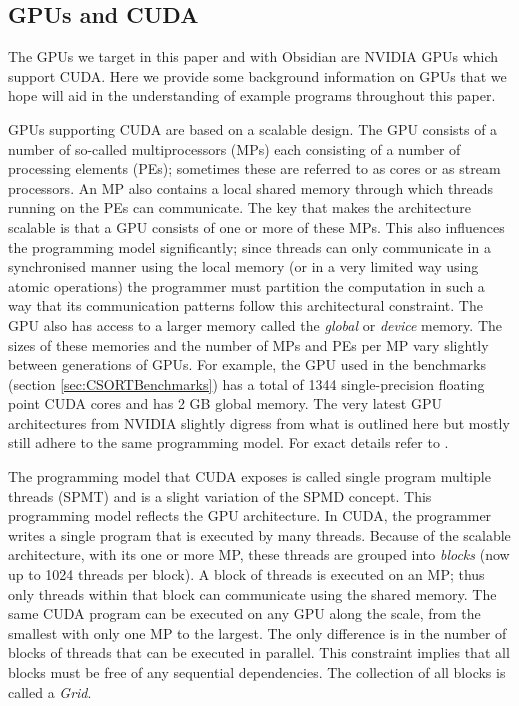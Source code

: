 \subsection{GPUs and CUDA} 

The GPUs we target in this paper and with Obsidian are NVIDIA GPUs which
support CUDA. Here we provide some background information on GPUs 
that we hope will aid in the understanding of example programs throughout this paper. 


GPUs supporting CUDA are based on a scalable design. The GPU consists of a 
number of so-called multiprocessors (MPs) each consisting of a number of 
processing elements (PEs); sometimes these are referred to as cores or as 
stream processors. An MP also contains a local shared memory through which 
threads running on the PEs can communicate. The key that 
makes the architecture scalable is that a GPU consists of one or more 
of these MPs. This also influences the programming model significantly; since
threads can only communicate in a synchronised manner using the local memory 
(or in a very limited way using atomic operations) the programmer must 
partition the computation in such a way that its communication patterns 
follow this architectural constraint. The GPU also has access to a larger 
memory called the {\em global} or {\em device} memory. The sizes of these 
memories and the number of MPs and PEs per MP vary slightly between 
generations of GPUs. For example, the GPU used in the benchmarks 
(section \ref{sec:CSORTBenchmarks}) has a total of 1344 single-precision floating
point CUDA cores and has 2 GB global memory. The very latest GPU architectures 
from NVIDIA slightly digress from what is outlined here but mostly still 
adhere to the same programming model. For exact details refer to \cite{KEPLER}.  

The programming model that CUDA exposes is called single program multiple 
threads (SPMT) and is a slight variation of the SPMD concept. This programming 
model reflects the GPU architecture. In CUDA, the programmer writes a single 
program that is executed by many threads. Because of the scalable architecture,
with its one or more MP, these threads are grouped into {\em blocks} 
(now up to 1024 threads per block). A block of threads is executed on an MP; 
thus only threads within that block can communicate using the shared memory. 
The same CUDA program can be executed on any GPU along the scale, from the 
smallest with only one MP to the largest. The only difference is in the number 
of blocks of threads that can be executed in parallel. This constraint implies 
that all blocks must be free of any sequential dependencies. The collection of 
all blocks is called a {\em Grid}.

